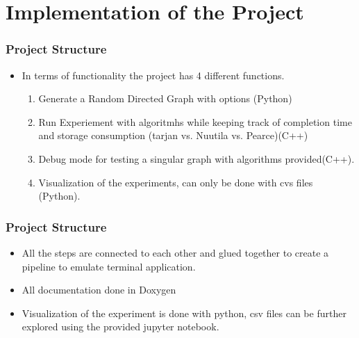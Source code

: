 \documentclass{beamer}
\begin{document}
	\section{Implementation of the Project}
		\begin{frame}
			\frametitle{Project Structure}
			\begin{itemize}
				\item <1-> In terms of functionality the project has 4 different functions.
				\begin{enumerate}
					\item <2-> Generate a Random Directed Graph with options (Python)
					\item <3-> Run Experiement with algoritmhs while keeping track of completion time and storage consumption (tarjan vs. Nuutila vs. Pearce)(C++)
					\item <4-> Debug mode for testing a singular graph with algorithms provided(C++).
					\item <5-> Visualization of the experiments, can only be done with cvs files (Python).
				\end{enumerate}
			\end{itemize}
		\end{frame}
		\begin{frame}
			\frametitle{Project Structure}
			\begin{itemize}
				\item <1-> All the steps are connected to each other and glued together to create a pipeline to emulate terminal application.
				\item <2-> All documentation done in Doxygen
				\item <3-> Visualization of the experiment is done with python, csv files can be further explored using the provided jupyter notebook.
			\end{itemize}
		\end{frame}
\end{document}
